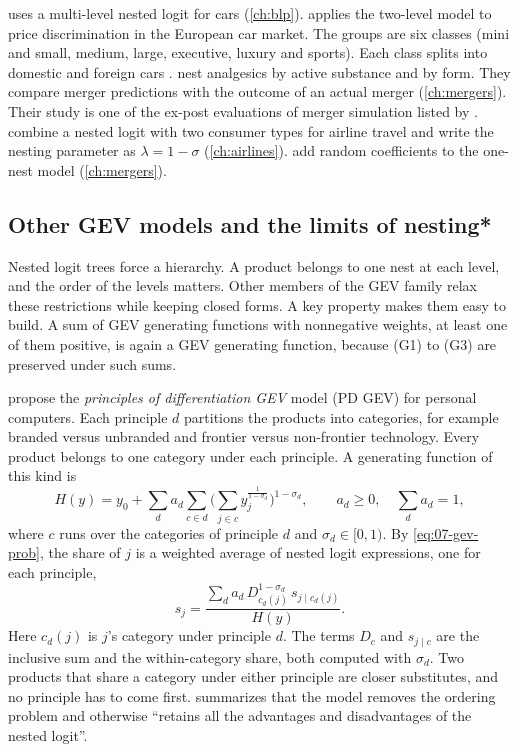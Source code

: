 \citet{Goldberg1995} uses a multi-level nested logit for cars (\cref{ch:blp}).
\citet{Verboven1996} applies the two-level model to price discrimination in the European car market. The groups are
six classes (mini and small, medium, large, executive, luxury and sports). Each class splits into domestic and
foreign cars \citep[pp.~251 and 254]{Verboven1996}.
\citet{BjornerstedtVerboven2016} nest analgesics by active substance and by form. They compare merger predictions with
the outcome of an actual merger (\cref{ch:mergers}). Their study is one of the ex-post evaluations of merger
simulation listed by \citet[p.~231]{AskerNocke2021}. \citet{BerryCarnallSpiller2006} combine a nested logit with two
consumer types for airline travel and write the nesting parameter as $\lambda = 1 - \sigma$ (\cref{ch:airlines}).
\citet{MillerWeinberg2017} add random coefficients to the one-nest model (\cref{ch:mergers}).

\subsection{Other GEV models and the limits of nesting*}\label{sec:07-gev-other}

Nested logit trees force a hierarchy. A product belongs to one nest at each level, and the order of the levels
matters. Other members of the GEV family relax these restrictions while keeping closed forms. A key property makes
them easy to build. A sum of GEV generating functions with nonnegative weights, at least one of them positive, is
again a GEV generating function, because (G1) to (G3) are preserved under such sums.

\citet{BresnahanSternTrajtenberg1997} propose the \emph{principles of differentiation GEV} model (PD GEV) for
personal computers. Each principle $d$ partitions the products into categories, for example branded versus
unbranded and frontier versus non-frontier technology. Every product belongs to one category under each principle.
A generating function of this kind is
\begin{equation}\label{eq:07-pdgev}
H(y) = y_0 + \sum_{d} a_d\sum_{c \in d}\Big(\sum_{j \in c}y_j^{\frac{1}{1-\sigma_d}}\Big)^{1-\sigma_d},
\qquad a_d \ge 0, \quad \sum_d a_d = 1 ,
\end{equation}
where $c$ runs over the categories of principle $d$ and $\sigma_d \in [0, 1)$. By \eqref{eq:07-gev-prob}, the share
of $j$ is a weighted average of nested logit expressions, one for each principle,
\begin{equation*}
s_j = \frac{\sum_d a_d\,D_{c_d(j)}^{1-\sigma_d}\,s_{j \mid c_d(j)}}{H(y)} .
\end{equation*}
Here $c_d(j)$ is $j$'s category under principle $d$. The terms $D_c$ and $s_{j \mid c}$ are the inclusive sum and the
within-category share, both computed with $\sigma_d$. Two products that share a category under either principle are closer
substitutes, and no principle has to come first. \citet[p.~525]{Nevo2000a} summarizes that the model removes the
ordering problem and otherwise ``retains all the advantages and disadvantages of the nested logit''.

